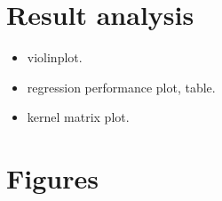 \section{Result analysis}

\begin{itemize}
    \item violinplot.
    \item regression performance plot, table.
    \item kernel matrix plot.
\end{itemize}

\section{Figures}



